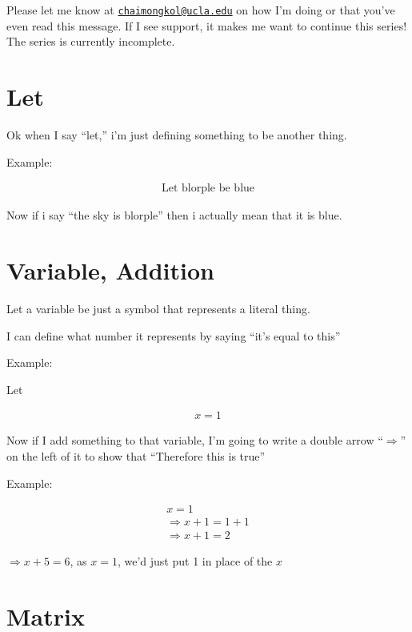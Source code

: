\documentclass[
]{article}
\providecommand{\Rarr}{\Rightarrow}
\begin{document}
Please let me know at
\href{mailto:chaimongkol@ucla.edu}{\nolinkurl{chaimongkol@ucla.edu}} on
how I'm doing or that you've even read this message. If I see support,
it makes me want to continue this series! The series is currently
incomplete.

\newpage
\makeatletter
\renewcommand{\l@subsection}{\@dottedtocline{2}{1.5em}{2.8em}}
\makeatother
\tableofcontents
\newpage

\section{Let}\label{let}

Ok when I say ``let,'' i'm just defining something to be another thing.

Example:

\begin{gather*}
	\text{Let blorple be blue}
\end{gather*}

Now if i say ``the sky is blorple'' then i actually mean that it is
blue.


\section{Variable, Addition}\label{variables-addition}

Let a variable be just a symbol that represents a literal thing.

I can define what number it represents by saying ``it's equal to this''

Example:

Let

\begin{gather*}
	x=1
\end{gather*}

Now if I add something to that variable, I'm going to write a double
arrow ``\(\Rarr\)'' on the left of it to show that ``Therefore this is
true''

Example:

\begin{gather*}
	x=1\\
	\Rarr x+1=1+1\\
	\Rarr x+1=2
\end{gather*}



\(\Rarr x+5=6\), as \(x=1\), we'd just put 1 in place of the \(x\)


\section{Matrix}\label{matrices}
\end{document}

